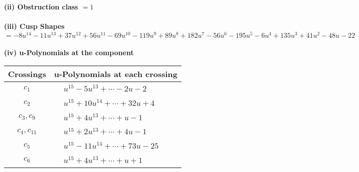 \documentclass[1p]{elsarticle_modified}
\theoremstyle{definition}
\begin{document}
\flushleft \textbf{(ii) Obstruction class $= 1$}\\~\\
\flushleft \textbf{(iii) Cusp Shapes $= -8 u^{14}-11 u^{13}+37 u^{12}+56 u^{11}-69 u^{10}-119 u^9+89 u^8+182 u^7-56 u^6-195 u^5-6 u^4+135 u^3+41 u^2-48 u-22$}\\~\\
\newpage\renewcommand{\arraystretch}{1}
\flushleft \textbf{(iv) u-Polynomials at the component}\newline \\
\begin{tabular}{m{50pt}|m{274pt}}
Crossings & \hspace{64pt}u-Polynomials at each crossing \\
\hline $$\begin{aligned}c_{1}\end{aligned}$$&$\begin{aligned}
&u^{15}-5 u^{13}+\cdots-2 u-2
\end{aligned}$\\
\hline $$\begin{aligned}c_{2}\end{aligned}$$&$\begin{aligned}
&u^{15}+10 u^{14}+\cdots+32 u+4
\end{aligned}$\\
\hline $$\begin{aligned}c_{3},c_{9}\end{aligned}$$&$\begin{aligned}
&u^{15}+4 u^{13}+\cdots+u-1
\end{aligned}$\\
\hline $$\begin{aligned}c_{4},c_{11}\end{aligned}$$&$\begin{aligned}
&u^{15}+2 u^{13}+\cdots+4 u-1
\end{aligned}$\\
\hline $$\begin{aligned}c_{5}\end{aligned}$$&$\begin{aligned}
&u^{15}-11 u^{14}+\cdots+73 u-25
\end{aligned}$\\
\hline $$\begin{aligned}c_{6}\end{aligned}$$&$\begin{aligned}
&u^{15}+4 u^{13}+\cdots+u+1
\end{aligned}$\\

\end{tabular}
\end{document}
